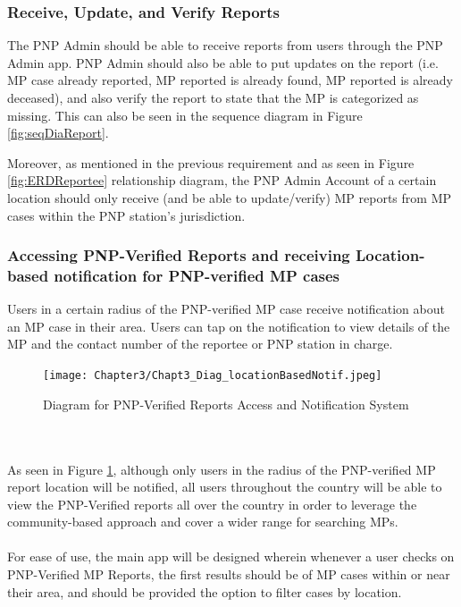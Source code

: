 \subsubsection{Receive, Update, and Verify Reports}
The PNP Admin should be able to receive reports from users through the PNP Admin app. PNP Admin should also be able to put updates on the report (i.e. MP case already reported, MP reported is already found, MP reported is already deceased), and also verify the report to state that the MP is categorized as missing. This can also be seen in the sequence diagram in Figure \ref{fig:seqDiaReport}. 

Moreover, as mentioned in the previous requirement and as seen in Figure \ref{fig:ERDReportee} relationship diagram, the PNP Admin Account of a certain location should only receive (and be able to update/verify) MP reports from MP cases within the PNP station’s jurisdiction.

\subsubsection{Accessing PNP-Verified Reports and receiving Location-based notification for PNP-verified MP cases}

Users in a certain radius of the PNP-verified MP case receive notification about an MP case in their area. Users can tap on the notification to view details of the MP and the contact number of the reportee or PNP station in charge.

\begin{figure}[!h]
    \centering
    \texttt{[image: Chapter3/Chapt3\_Diag\_locationBasedNotif.jpeg]}
    \caption{Diagram for PNP-Verified Reports Access and Notification System}
    \label{fig:diagramLocation}
\end{figure}
\\\\As seen in Figure \ref{fig:diagramLocation}, although only users in the radius of the PNP-verified MP report location will be notified, all users throughout the country will be able to view the PNP-Verified reports all over the country in order to leverage the community-based approach and cover a wider range for searching MPs. 
\\\\For ease of use, the main app will be designed wherein whenever a user checks on PNP-Verified MP Reports, the first results should be of MP cases within or near their area, and should be provided the option to filter cases by location.
\newpage
